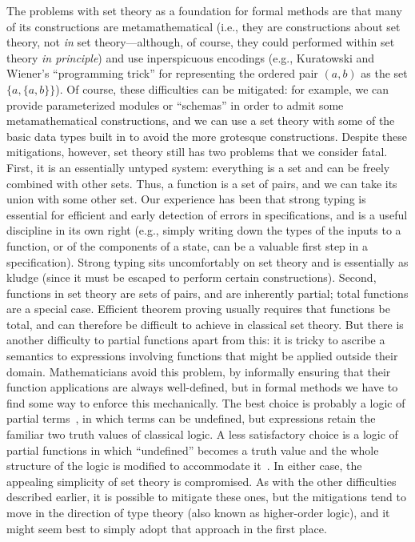 {The problems with set theory as a foundation for formal methods are
that many of its constructions are metamathematical (i.e., they are
constructions about set theory, not {\em in\/} set theory---although,
of course, they could performed within set theory {\em in
principle\/}) and use inperspicuous encodings (e.g., Kuratowski and
Wiener's ``programming trick'' for representing the ordered pair $(a,
b)$ as the set $\{a, \{a, b\}\}$).  Of course, these difficulties can
be mitigated: for example, we can provide parameterized modules or
``schemas'' in order to admit some metamathematical constructions,
and we can use a set theory with some of the basic data types built
in to avoid the more grotesque constructions.  Despite these
mitigations, however, set theory still has two problems that we
consider fatal.  First, it is an essentially untyped system:
everything is a set and can be freely combined with other sets.
Thus, a function is a set of pairs, and we can take its union with
some other set.  Our experience has been that strong typing is
essential for efficient and early detection of errors in
specifications, and is a useful discipline in its own right (e.g.,
simply writing down the types of the inputs to a function, or of the
components of a state, can be a valuable first step in a
specification).  Strong typing sits uncomfortably on set theory and
is essentially as kludge (since it must be escaped to perform certain
constructions).  Second, functions in set theory are sets of pairs,
and are inherently partial; total functions are a special case.
Efficient theorem proving usually requires that functions be total,
and can therefore be difficult to achieve in classical set theory.
But there is another difficulty to partial functions apart from this:
it is tricky to ascribe a semantics to expressions involving
functions that might be applied outside their domain.  Mathematicians
avoid this problem, by informally ensuring that their function
applications are always well-defined, but in formal methods we have
to find some way to enforce this mechanically.  The best choice is
probably a logic of partial terms~\cite{Beeson86}, in which terms can
be undefined, but expressions retain the familiar two truth values of
classical logic.  A less satisfactory choice is a logic of partial
functions in which ``undefined'' becomes a truth value and the whole
structure of the logic is modified to accommodate
it~\cite{Cheng&Jones90}.  In either case, the appealing simplicity of
set theory is compromised.  As with the other difficulties described
earlier, it is possible to mitigate these ones, but the mitigations
tend to move in the direction of type theory (also known as
higher-order logic), and it might seem best to simply adopt that
approach in the first place.

}

